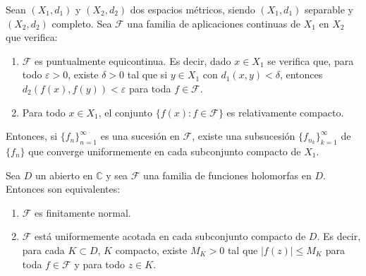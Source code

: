 \begin{theorem}
    Sean $(X_1, d_1)$ y $(X_2, d_2)$ dos espacios métricos, siendo $(X_1, d_1)$ separable y $(X_2, d_2)$ completo.
    Sea $\mathcal{F}$ una familia de aplicaciones continuas de $X_1$ en $X_2$ que verifica:
    \begin{enumerate}
        \item $\mathcal{F}$ es puntualmente equicontinua.
              Es decir, dado $x \in X_1$ se verifica que, para todo $\varepsilon > 0$, existe $\delta > 0$ tal que si $y \in X_1$ con $d_1(x, y) < \delta$, entonces $d_2(f(x), f(y)) < \varepsilon$ para toda $f \in \mathcal{F}$.
        \item Para todo $x \in X_1$, el conjunto $\{f(x) : f \in \mathcal{F}\}$ es relativamente compacto.
    \end{enumerate}
    Entonces, si $\{f_n\}_{n=1}^\infty$ es una sucesión en $\mathcal{F}$, existe una subsucesión $\{f_{n_k}\}_{k=1}^\infty$ de $\{f_n\}$ que converge uniformemente en cada subconjunto compacto de $X_1$.
\end{theorem}

\begin{theorem}
    Sea $D$ un abierto en $\mathbb{C}$ y sea $\mathcal{F}$ una familia de funciones holomorfas en $D$.
    Entonces son equivalentes:
    \begin{enumerate}
        \item $\mathcal{F}$ es finitamente normal.
        \item $\mathcal{F}$ está uniformemente acotada en cada subconjunto compacto de $D$.
              Es decir, para cada $K \subset D$, $K$ compacto, existe $M_K > 0$ tal que $|f(z)| \leq M_K$ para toda $f \in \mathcal{F}$ y para todo $z \in K$.
    \end{enumerate}
\end{theorem}

